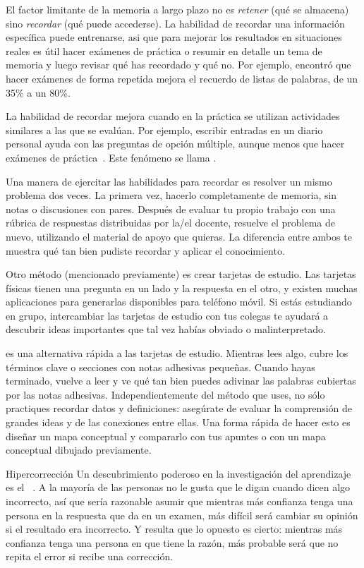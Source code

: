 El factor limitante de la memoria a largo plazo no es \emph{retener} (qué se almacena)
sino \emph{recordar} (qué puede accederse).
La habilidad de recordar una información específica puede entrenarse,
asi que para mejorar los resultados en situaciones reales
es útil hacer exámenes de práctica o resumir en detalle un tema de memoria
y luego revisar qué has recordado y qué no.
Por ejemplo,
\cite{Karp2008} encontró que hacer exámenes de forma repetida mejora el recuerdo de listas de palabras, de un 35\% a un 80\%.

La habilidad de recordar mejora cuando en la práctica se utilizan actividades similares a las que se evalúan.
Por ejemplo,
escribir entradas en un diario personal ayuda con las preguntas de opción múltiple,
aunque menos que hacer exámenes de práctica~\cite{Mill2016a}.
Este fenómeno se llama
.

Una manera de ejercitar las habilidades para recordar es resolver un mismo problema dos veces.
La primera vez,
hacerlo completamente de memoria, sin notas o discusiones con pares.
Después de evaluar tu propio trabajo con una rúbrica de respuestas distribuidas por la/el docente,
resuelve el problema de nuevo, utilizando el material de apoyo que quieras.
La diferencia entre ambos te muestra qué tan bien pudiste recordar y aplicar el conocimiento.

Otro método (mencionado previamente) es crear tarjetas de estudio.
Las tarjetas físicas tienen una pregunta en un lado y la respuesta en el otro,
y existen muchas aplicaciones para generarlas disponibles para teléfono móvil.
Si estás estudiando en grupo,
intercambiar las tarjetas de estudio con tus colegas
te ayudará a descubrir ideas importantes que tal vez habías obviado o malinterpretado.

es una alternativa rápida a las tarjetas de estudio.
Mientras lees algo,
cubre los términos clave o secciones con notas adhesivas pequeñas.
Cuando hayas terminado,
vuelve a leer y ve qué tan bien puedes adivinar las palabras cubiertas por las notas adhesivas.
Independientemente del método que uses,
no sólo practiques recordar datos y definiciones:
asegúrate de evaluar la comprensión de grandes ideas 
y de las conexiones entre ellas.
Una forma rápida de hacer esto es
diseñar un mapa conceptual y compararlo con tus apuntes
o con un mapa conceptual dibujado previamente.

\begin{aside}{Hipercorrección}
    Un descubrimiento poderoso en la investigación del aprendizaje es
  el ~\cite{Metc2016}.
  A la mayoría de las personas no le gusta que le digan cuando dicen algo incorrecto,
  así que sería razonable asumir que
  mientras más confianza tenga una persona en la respuesta que da en un examen,
  más difícil será cambiar su opinión si el resultado era incorrecto.
  Y resulta que lo opuesto es cierto:
  mientras más confianza tenga una persona en que tiene la razón,
  más probable será que no repita el error si recibe una corrección.
\end{aside}

